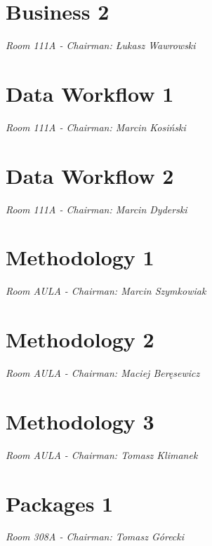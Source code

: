 \documentclass[11pt,twoside]{book}
\begin{document}
\chapter{Business 2}{\LARGE \textit{Room 111A - Chairman: Łukasz Wawrowski}}






\chapter{Data Workflow 1}{\LARGE \textit{Room 111A - Chairman: Marcin Kosiński}}





\chapter{Data Workflow 2}{\LARGE \textit{Room 111A - Chairman: Marcin Dyderski}}





\chapter{Methodology 1}{\LARGE \textit{Room AULA - Chairman: Marcin Szymkowiak}}




\chapter{Methodology 2}{\LARGE \textit{Room AULA - Chairman: Maciej Beręsewicz}}






\chapter{Methodology 3}{\LARGE \textit{Room AULA - Chairman: Tomasz Klimanek}}





\chapter{Packages 1}{\LARGE \textit{Room 308A - Chairman: Tomasz Górecki}}




% 

\end{document}
